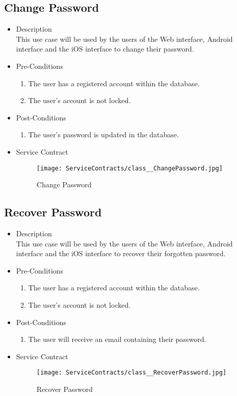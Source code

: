 \documentclass[11pt,fleqn]{book} %
\begin{document}
\subsection{Change Password}
\begin{itemize}
	\item Description\\
	This use case will be used by the users of the Web interface, Android interface and the iOS interface to change their password.
	\item Pre-Conditions
	\begin{enumerate}
		\item The user has a registered account within the database.
		\item The user’s account is not locked.
	\end{enumerate}
	\item Post-Conditions
	\begin{enumerate}
		\item The user’s password is updated in the database. 
	\end{enumerate}
	\item Service Contract
	\begin{figure}
		\texttt{[image: ServiceContracts/class\_\_ChangePassword.jpg]}
		\caption{Change Password}
	\end{figure}
\end{itemize}

\subsection{Recover Password}
\begin{itemize}
	\item Description\\
	This use case will be used by the users of the Web interface, Android interface and the iOS interface to recover their forgotten password.
	\item Pre-Conditions
	\begin{enumerate}
		\item The user has a registered account within the database.
		\item The user’s account is not locked.
	\end{enumerate}
	\item Post-Conditions
	\begin{enumerate}
		\item The user will receive an email containing their password.
	\end{enumerate}
	\item Service Contract
	\begin{figure}
		\texttt{[image: ServiceContracts/class\_\_RecoverPassword.jpg]}
		\caption{Recover Password}
	\end{figure}
\end{itemize}
\end{document}
